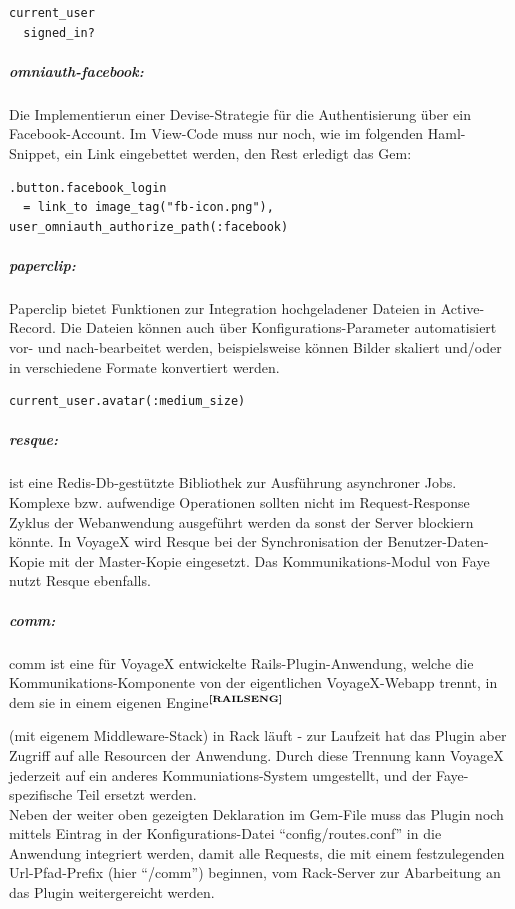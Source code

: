 \lstset{language=Ruby}
\begin{lstlisting}[frame=single,xleftmargin=0pt,numbers=none]
  current_user
  signed_in?
\end{lstlisting}
\subparagraph{omniauth-facebook:}Die Implementierun einer Devise-Strategie für die Authentisierung über ein Facebook-Account. Im View-Code muss nur noch, wie im folgenden Haml-Snippet, ein Link eingebettet werden, den Rest erledigt das Gem:
\begin{lstlisting}[frame=single,xleftmargin=0pt,numbers=none]
.button.facebook_login
  = link_to image_tag("fb-icon.png"), user_omniauth_authorize_path(:facebook)
\end{lstlisting}
\subparagraph{paperclip:}Paperclip bietet Funktionen zur Integration hochgeladener Dateien in Active-Record. Die Dateien können auch über Konfigurations-Parameter automatisiert vor- und nach-bearbeitet werden, beispielsweise können Bilder skaliert und/oder in verschiedene Formate konvertiert werden.
\begin{lstlisting}[frame=single,xleftmargin=0pt,numbers=none]
  current_user.avatar(:medium_size)
\end{lstlisting}
\subparagraph{resque:}ist eine Redis-Db-gestützte Bibliothek zur Ausführung asynchroner Jobs. Komplexe bzw. aufwendige Operationen sollten nicht im Request-Response Zyklus der Webanwendung ausgeführt werden da sonst
der Server blockiern könnte. In VoyageX wird Resque bei der Synchronisation der Benutzer-Daten-Kopie mit der Master-Kopie eingesetzt. Das Kommunikations-Modul von Faye nutzt Resque ebenfalls.
\subparagraph{comm:}comm ist eine für VoyageX entwickelte Rails-Plugin-Anwendung, welche die Kommunikations-Komponente von der eigentlichen VoyageX-Webapp trennt, in dem sie in einem eigenen Engine$^{\textbf{\ref{RAILSENG}}}$%
\addtocounter{footnote}{1}%
(mit eigenem Middleware-Stack) in Rack läuft - zur Laufzeit hat das Plugin aber Zugriff auf alle Resourcen der Anwendung. Durch diese Trennung kann VoyageX jederzeit auf ein anderes Kommuniations-System umgestellt, und der Faye-spezifische Teil ersetzt werden.\\
Neben der weiter oben gezeigten Deklaration im Gem-File muss das Plugin noch mittels Eintrag in der Konfigurations-Datei "`config/routes.conf"' in die Anwendung integriert werden, damit alle Requests, die mit einem festzulegenden Url-Pfad-Prefix (hier "`/comm"') beginnen, vom Rack-Server zur Abarbeitung an das Plugin weitergereicht werden.
